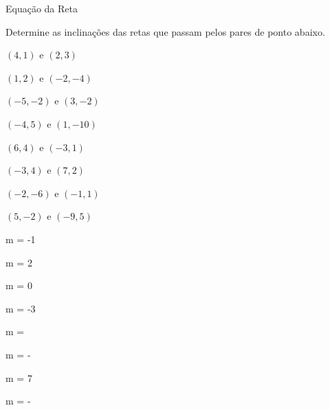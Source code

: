 \begin{exercicios}{Equação da Reta}
    \begin{exercicio}
        Determine as inclinações das retas que passam pelos pares de ponto abaixo.
        \begin{alphalist}[2]
            \item $(4,1)$ e $(2,3)$
            \item $(1,2)$ e $(-2,-4)$
            \item $(-5,-2)$ e $(3,-2)$
            \item $(-4,5)$ e $(1,-10)$
            \item $(6,4)$ e $(-3,1)$
            \item $(-3,4)$ e $(7,2)$
            \item $(-2,-6)$ e $(-1,1)$
            \item $(5,-2)$ e $(-9,5)$
        \end{alphalist}
        \begin{answers}
            \begin{mathlist}[4]
                \item m = -1
                \item m = 2
                \item m = 0
                \item m = -3
                \item m = 
                \item m = - 
                \item m = 7
                \item m = - 
            \end{mathlist}
        \end{answers}
    \end{exercicio}
    

\end{exercicios}
